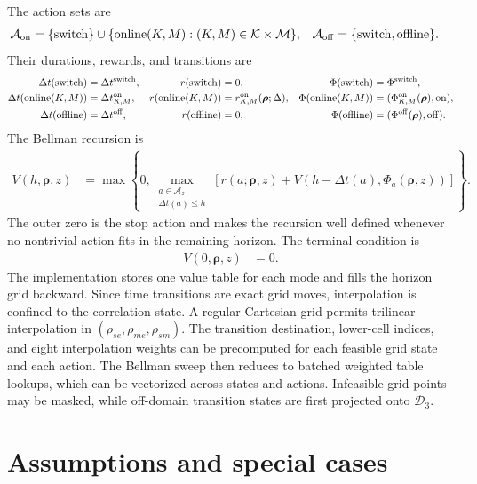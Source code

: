 \documentclass{article}
\begin{document}
The action sets are
\begin{align}
\mathcal A_{\rm on} &= \{{\rm switch}\}\cup\{{\rm online}(K,M):(K,M)\in\mathcal K\times\mathcal M\}, & \mathcal A_{\rm off} &= \{{\rm switch},{\rm offline}\}.
\end{align}
Their durations, rewards, and transitions are
\begin{align}
\Delta t({\rm switch}) &= \Delta t^{\rm switch}, & r({\rm switch}) &= 0, & \Phi({\rm switch}) &= \Phi^{\rm switch}, \\
\Delta t({\rm online}(K,M)) &= \Delta t_{K,M}^{\rm on}, & r({\rm online}(K,M)) &= r_{K,M}^{\rm on}(\boldsymbol\rho;\Delta), & \Phi({\rm online}(K,M)) &= (\Phi_{K,M}^{\rm on}(\boldsymbol\rho),{\rm on}), \\
\Delta t({\rm offline}) &= \Delta t^{\rm off}, & r({\rm offline}) &= 0, & \Phi({\rm offline}) &= (\Phi^{\rm off}(\boldsymbol\rho),{\rm off}).
\end{align}
The Bellman recursion is
\begin{align}
V(h,\boldsymbol\rho,z) &= \max\left\{0,\max_{\substack{a\in\mathcal A_z \\
\Delta t(a)\leq h}}\left[r(a;\boldsymbol\rho,z)+V\left(h-\Delta t(a),\Phi_a(\boldsymbol\rho,z)\right)\right]\right\}.
\end{align}
The outer zero is the stop action and makes the recursion well defined whenever no nontrivial action fits in the remaining horizon. The terminal condition is
\begin{align}
V(0,\boldsymbol\rho,z) &= 0.
\end{align}
The implementation stores one value table for each mode and fills the horizon grid backward. Since time transitions are exact grid moves, interpolation is confined to the correlation state. A regular Cartesian grid permits trilinear interpolation in $(\rho_{se},\rho_{me},\rho_{sm})$. The transition destination, lower-cell indices, and eight interpolation weights can be precomputed for each feasible grid state and each action. The Bellman sweep then reduces to batched weighted table lookups, which can be vectorized across states and actions. Infeasible grid points may be masked, while off-domain transition states are first projected onto $\mathcal D_3$.

\section{Assumptions and special cases}
\end{document}

